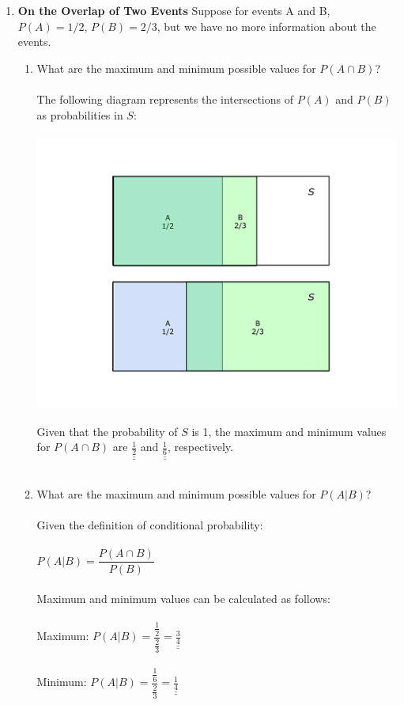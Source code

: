 \documentclass[12pt,a4paper]{article}
\numberwithin{equation}{subsection}
\def\doubleunderline#1{\underline{\underline{#1}}}
\begin{document}
\begin{enumerate}
\item \textbf{On the Overlap of Two Events}
Suppose for events A and B, $P(A) = 1/2$, $P(B) = 2/3$, but we have no more information about the events.
 \begin{enumerate}
\item What are the maximum and minimum possible values for $P(A \cap B)$? \\ \\
The following diagram represents the intersections of $P(A)$ and $P(B)$ as probabilities in $S$: \\ \\
\includegraphics{images/unit3-q3_min-max-area.png}

Given that the probability of $S$ is 1, the maximum and minimum values for $P(A \cap B)$ are $\doubleunderline{\frac{1}{2}}$ and $\doubleunderline{\frac{1}{6}}$, respectively. \\ \\
\item What are the maximum and minimum possible values for $P(A|B)$? \\ \\
Given the definition of conditional probability: \\ \\ 
$P(A|B) = \dfrac{P(A \cap B)}{P(B)}$ \\ \\
Maximum and minimum values can be calculated as follows: \\ \\
Maximum: $P(A|B) = \dfrac{\frac{1}{2}}{\frac{2}{3}} = \doubleunderline{\frac{3}{4}}$ \\ \\
Minimum: $P(A|B) = \dfrac{\frac{1}{6}}{\frac{2}{3}} = \doubleunderline{\frac{1}{4}}$
\end{enumerate}


\end{enumerate}
\end{document}
